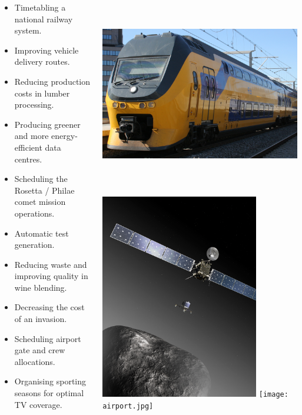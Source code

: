 \documentclass[a0paper]{tikzposter}
\begin{document}
\begin{columns}
{\begin{itemize}
    \item Timetabling a national railway system.
    \item Improving vehicle delivery routes.
    \item Reducing production costs in lumber processing.
    \item Producing greener and more energy-efficient data centres.
    \item Scheduling the Rosetta / Philae comet mission operations.
    \item Automatic test generation.
    \item Reducing waste and improving quality in wine blending.
    \item Decreasing the cost of an invasion.
    \item Scheduling airport gate and crew allocations.
    \item Organising sporting seasons for optimal TV coverage.
\end{itemize}

\vspace{0.7em}

\begin{center}
    \includegraphics*[keepaspectratio=true,height=9cm]{train.jpg}
    \hfill
    \includegraphics*[keepaspectratio=true,height=9cm]{comet.jpg}
    \hfill
    \texttt{[image: airport.jpg]}
\end{center}

}
\end{columns}
\end{document}
